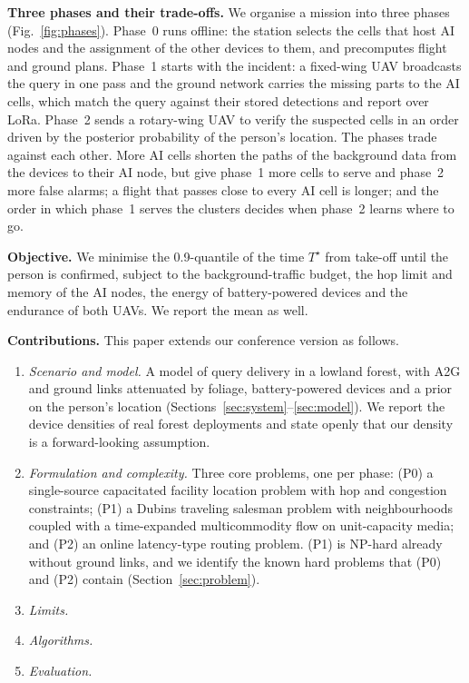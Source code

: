 \textbf{Three phases and their trade-offs.} We organise a mission into three phases (Fig.~\ref{fig:phases}). Phase~0
runs offline: the station selects the cells that host AI nodes and the assignment of the other devices to them, and
precomputes flight and ground plans. Phase~1 starts with the incident: a fixed-wing UAV broadcasts the query in one pass
and the ground network carries the missing parts to the AI cells, which match the query against their stored detections
and report over LoRa. Phase~2 sends a rotary-wing UAV to verify the suspected cells in an order driven by the posterior
probability of the person's location. The phases trade against each other. More AI cells shorten the paths of the
background data from the devices to their AI node, but give phase~1 more cells to serve and phase~2 more false alarms;
a flight that passes close to every AI cell is longer; and the order in which phase~1 serves the clusters decides when
phase~2 learns where to go.

\textbf{Objective.} We minimise the 0.9-quantile of the time $T^\star$ from take-off until the person is confirmed,
subject to the background-traffic budget, the hop limit and memory of the AI nodes, the energy of battery-powered
devices and the endurance of both UAVs. We report the mean as well.

\textbf{Contributions.} This paper extends our conference version  as follows.
\begin{enumerate}
\item \emph{Scenario and model.} A model of query delivery in a lowland forest, with A2G and ground links attenuated by
foliage, battery-powered devices and a prior on the person's location (Sections~\ref{sec:system}--\ref{sec:model}). We
report the device densities of real forest deployments and state openly that our density is a forward-looking
assumption.
\item \emph{Formulation and complexity.} Three core problems, one per phase: (P0) a single-source capacitated facility
location problem with hop and congestion constraints; (P1) a Dubins traveling salesman problem with neighbourhoods
coupled with a time-expanded multicommodity flow on unit-capacity media; and (P2) an online latency-type routing
problem. (P1) is NP-hard already without ground links, and we identify the known hard problems that (P0) and (P2)
contain (Section~\ref{sec:problem}).
\item \emph{Limits.} 
\item \emph{Algorithms.} 
\item \emph{Evaluation.} 
\end{enumerate}


